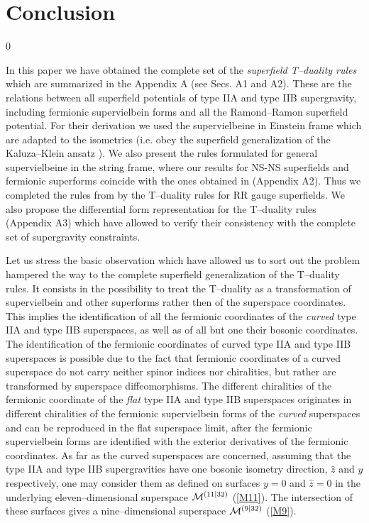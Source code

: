 \documentclass[a4paper,11pt]{article}
\begin{document}
\section{Conclusion}
\setcounter{equation}0


In this paper we have obtained the complete set of the  
{\sl superfield T--duality rules} which are summarized in the Appendix A 
(see Secs. A1 and A2). 
These are  the relations between all 
superfield potentials of type IIA and type IIB supergravity,  
including fermionic supervielbein forms and 
all the  Ramond--Ramon superfield potential.
For their derivation we used the 
supervielbeine in Einstein frame which are 
adapted to the isometries 
(i.e. obey the superfield generalization of the Kaluza--Klein ansatz 
\cite{ansatz}). 
We also present the rules formulated for general  
supervielbeine in the string frame, 
where our results for NS-NS superfields and 
fermionic superforms coincide with the ones obtained 
in \cite{kulik} (Appendix A2). 
Thus we completed the rules from \cite{kulik} by 
the T--duality rules for RR gauge superfields. 
We also propose the differential form representation for 
the T--duality rules (Appendix A3)
which have allowed to verify their consistency 
with the complete set of supergravity constraints. 

Let us stress the  basic observation which have allowed us to 
sort out the problem hampered the way to the complete superfield   
generalization of the T--duality rules. 
It consists in the possibility to treat the T--duality as a transformation 
of supervielbein and other superforms rather then of the 
superspace coordinates.  
This implies the identification of all the fermionic coordinates of the 
{\sl curved} type IIA and type IIB superspaces, as well as of all but one 
their bosonic coordinates. 
The identification of the fermionic coordinates 
of curved type IIA and type IIB superspaces is possible due to the fact that 
 fermionic coordinates of a curved superspace do not carry neither spinor 
indices nor chiralities,  but rather are transformed by superspace 
diffeomorphisms. The different chiralities of the fermionic coordinate 
of the {\sl flat}   type IIA and type IIB superspaces originates 
in different chiralities of the fermionic supervielbein forms of 
the {\sl curved} superspaces and can be reproduced in the flat superspace 
limit, after the fermionic supervielbein forms are identified 
with the exterior derivatives of the fermionic coordinates.  
As far as the curved superspaces are concerned, 
assuming that the type IIA and 
type IIB supergravities have one bosonic isometry direction, $\hat{z}$ and $y$ 
respectively, one may consider them as defined on surfaces $y=0$ and 
$\hat{z}=0$ in the underlying eleven--dimensional 
superspace ${\cal M}^{(11|32)}$ (\ref{M11}). 
The intersection of these surfaces gives a nine--dimensional superspace  
${\cal M}^{(9|32)}$ (\ref{M9}). 
\end{document}
